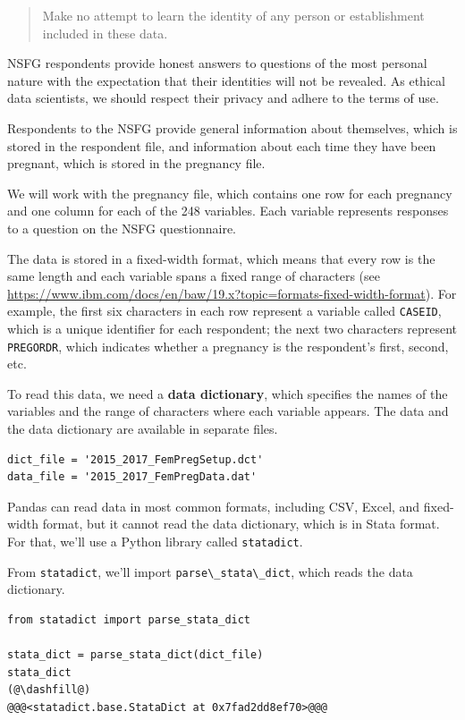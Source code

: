 \begin{quote}
Make no attempt to learn the identity of any person or establishment
included in these data.
\end{quote}

NSFG respondents provide honest answers to questions of the most
personal nature with the expectation that their identities will not be
revealed. As ethical data scientists, we should respect their privacy
and adhere to the terms of use.

Respondents to the NSFG provide general information about themselves,
which is stored in the respondent file, and information about each time
they have been pregnant, which is stored in the pregnancy file.

We will work with the pregnancy file, which contains one row for each
pregnancy and one column for each of the 248 variables. Each variable
represents responses to a question on the NSFG questionnaire.

The data is stored in a fixed-width format, which means that every row
is the same length and each variable spans a fixed range of characters
(see
\url{https://www.ibm.com/docs/en/baw/19.x?topic=formats-fixed-width-format}).
For example, the first six characters in each row represent a variable
called \passthrough{\lstinline!CASEID!}, which is a unique identifier
for each respondent; the next two characters represent
\passthrough{\lstinline!PREGORDR!}, which indicates whether a pregnancy
is the respondent's first, second, etc.

To read this data, we need a \textbf{data dictionary}, which specifies
the names of the variables and the range of characters where each
variable appears. The data and the data dictionary are available in
separate files.

\begin{lstlisting}[]
dict_file = '2015_2017_FemPregSetup.dct'
data_file = '2015_2017_FemPregData.dat'
\end{lstlisting}

Pandas can read data in most common formats, including CSV, Excel, and
fixed-width format, but it cannot read the data dictionary, which is in
Stata format. For that, we'll use a Python library called
\passthrough{\lstinline!statadict!}.

From \passthrough{\lstinline!statadict!}, we'll import
\passthrough{\lstinline!parse\_stata\_dict!}, which reads the data
dictionary.

\begin{lstlisting}[]
from statadict import parse_stata_dict

stata_dict = parse_stata_dict(dict_file)
stata_dict
(@\dashfill@)
@@@<statadict.base.StataDict at 0x7fad2dd8ef70>@@@
\end{lstlisting}

